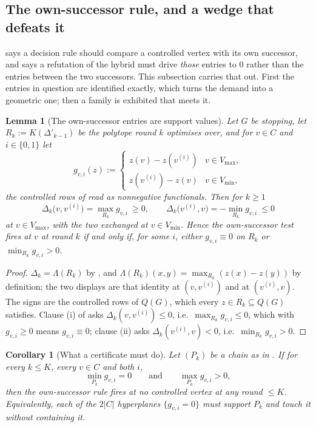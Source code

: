 \documentclass[11pt]{article}
\theoremstyle{plain}
\newtheorem{lemma}[theorem]{Lemma}
\newtheorem{corollary}[theorem]{Corollary}
\theoremstyle{definition}
\newcommand{\Vmax}{V_{\max}}
\newcommand{\Vmin}{V_{\min}}
\begin{document}
\subsection{The own-successor rule, and a wedge that defeats it}\label{sec:wedge}

 says a decision rule should compare a controlled vertex
with its own successor, and  says a
refutation of the hybrid must drive \emph{those} entries to $0$ rather than the
entries between the two successors. This subsection carries that out. First the
entries in question are identified exactly, which turns the demand into a
geometric one; then a family is exhibited that meets it.

\begin{lemma}[The own-successor entries are support values]\label{lem:wedge-face}
Let $G$ be stopping, let $R_k:=K(\Delta'_{k-1})$ be the polytope round $k$
optimises over, and for $v\in C$ and $i\in\{0,1\}$ let
\[
  g_{v,i}(z):=\begin{cases} z(v)-z(v^{(i)}) & v\in\Vmax,\\
                            z(v^{(i)})-z(v) & v\in\Vmin,\end{cases}
\]
the controlled rows of  read as nonnegative functionals.
Then for $k\ge1$
\[
  \Delta_k\bigl(v,v^{(i)}\bigr)=\max_{R_k}g_{v,i}\ \ge 0,
  \qquad
  \Delta_k\bigl(v^{(i)},v\bigr)=-\min_{R_k}g_{v,i}\ \le 0
\]
at $v\in\Vmax$, with the two exchanged at $v\in\Vmin$. Hence the own-successor
test fires at $v$ at round $k$ if and only if, for some $i$, either
$g_{v,i}\equiv0$ on $R_k$ or $\min_{R_k}g_{v,i}>0$.
\end{lemma}

\begin{proof}
$\Delta_k=\Lambda(R_k)$ by , and
$\Lambda(R_k)(x,y)=\max_{R_k}(z(x)-z(y))$ by definition; the two displays are
that identity at $(v,v^{(i)})$ and at $(v^{(i)},v)$. The signs are the
controlled rows of $Q(G)$, which every $z\in R_k\subseteq Q(G)$ satisfies.
Clause (i) of  asks $\Delta_k(v,v^{(i)})\le0$, i.e.\
$\max_{R_k}g_{v,i}\le0$, which with $g_{v,i}\ge0$ means $g_{v,i}\equiv0$;
clause (ii) asks $\Delta_k(v^{(i)},v)<0$, i.e.\ $\min_{R_k}g_{v,i}>0$.
\end{proof}

\begin{corollary}[What a certificate must do]\label{cor:wedge-cert}
Let $(P_k)$ be a chain as in \Cref{thm:hybrid-convex-barrier}. If for every
$k\le K$, every $v\in C$ and both $i$,
\[
  \min_{P_k}g_{v,i}=0\qquad\text{and}\qquad\max_{P_k}g_{v,i}>0,
\]
then the own-successor rule fires at no controlled vertex at any round $\le K$.
Equivalently, each of the $2|C|$ hyperplanes $\{g_{v,i}=0\}$ must \emph{support}
$P_k$ and \emph{touch} it without containing it.
\end{corollary}
\end{document}
